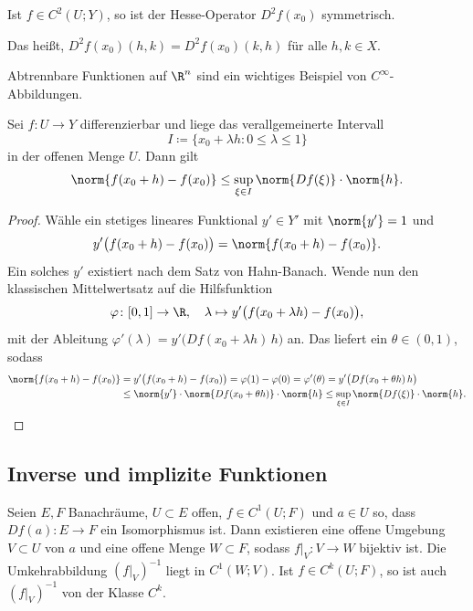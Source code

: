 \documentclass[11pt]{article}
\begin{document}
\begin{note}
  Ist $f \in C^2(U; Y)$, so ist der Hesse-Operator $D^2 f(x_0)$ symmetrisch.
  \begin{ergaenzung}
  Das heißt, $D^2 f(x_0)(h, k) = D^2 f(x_0)(k, h)$ für alle $h, k \in X$.
  \end{ergaenzung}
\end{note}


\begin{example}
  \glqq Abtrennbare\grqq{} Funktionen auf $\R^n$ sind ein wichtiges Beispiel von $C^\infty$-Abbildungen.
\end{example}


\begin{lemma}[Mittelwertsatz]\Theorem
  Sei $f\colon U \to Y$ differenzierbar und liege das verallgemeinerte Intervall
  \[ I \coloneqq \{ x_0 + \lambda h : 0 \le \lambda \le 1 \} \]
  in der offenen Menge $U$. Dann gilt
  \[ \norm{f(x_0 + h) - f(x_0)} \le \sup_{\xi \in I} \norm{Df(\xi)} \cdot \norm{h}. \]
\end{lemma}


\begin{proof}
  Wähle ein stetiges lineares Funktional $y' \in Y'$ mit $\norm{y'} = 1$ und
  \[ y'\bigl(f(x_0 + h) - f(x_0)\bigr) = \norm{f(x_0 + h) - f(x_0)}. \]
  Ein solches $y'$ existiert nach dem Satz von Hahn-Banach. Wende nun den klassischen Mittelwertsatz auf die Hilfsfunktion
  \[ \varphi\colon [0, 1] \to \R, \quad \lambda \mapsto y'\bigl(f(x_0 + \lambda h) - f(x_0)\bigr), \]
  mit der Ableitung $\varphi'(\lambda) = y'\bigl(Df(x_0 + \lambda h)\, h\bigr)$ an. Das liefert ein $\theta \in (0, 1)$, sodass
  \begin{align*}
    \norm{f(x_0 + h) - f(x_0)} &= y'\bigl(f(x_0 + h) - f(x_0)\bigr) = \varphi(1) - \varphi(0) = \varphi'(\theta) = y'\bigl(Df(x_0 + \theta h)\, h\bigr) \\
    &\le \norm{y'} \cdot \norm{Df(x_0 + \theta h)} \cdot \norm{h} \le \sup_{\xi \in I} \norm{Df(\xi)} \cdot \norm{h}. \qedhere
  \end{align*}
\end{proof}


\subsection{Inverse und implizite Funktionen}

\begin{theorem}\Theorem
  Seien $E, F$ Banachräume, $U \subset E$ offen, $f \in C^1(U; F)$ und $a \in U$ so, dass $Df(a)\colon E \to F$ ein Isomorphismus ist.
  Dann existieren eine offene Umgebung $V \subset U$ von $a$ und eine offene Menge $W \subset F$, sodass $f|_V\colon V \to W$ bijektiv ist.
  Die Umkehrabbildung $(f|_V)^{-1}$ liegt in $C^1(W; V)$.
  Ist $f \in C^k(U; F)$, so ist auch $(f|_V)^{-1}$ von der Klasse $C^k$.
\end{theorem}
\end{document}
